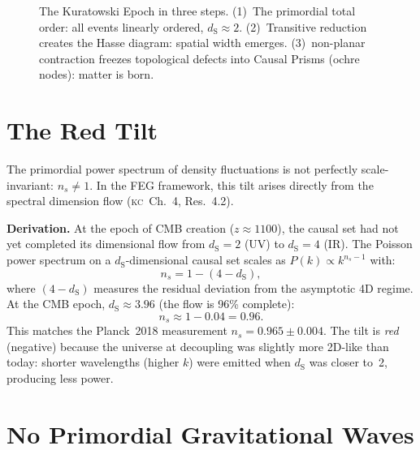 \documentclass[11pt, a4paper, openany]{book}
\newcommand{\dS}{d_{\mathrm{S}}}
\newcommand{\KC}[1]{\textnormal{(\textsc{kc}~#1)}}
\begin{document}
\begin{figure}[ht]
\caption{The Kuratowski Epoch in three steps.  (1)~The primordial
total order: all events linearly ordered, $\dS \approx 2$.
(2)~Transitive reduction creates the Hasse diagram: spatial width
emerges.  (3)~non-planar contraction freezes topological defects into
Causal Prisms (ochre nodes): matter is born.}
\label{fig:kuratowski-epoch}
\end{figure}

\section{The Red Tilt}\label{sec:tilt}

The primordial power spectrum of density fluctuations is not perfectly
scale-invariant: $n_s \neq 1$. In the FEG framework, this tilt arises
directly from the spectral dimension flow \KC{Ch.~4, Res.~4.2}.

\textbf{Derivation.} At the epoch of CMB creation ($z \approx 1100$),
the causal set had not yet completed its dimensional flow from
$\dS = 2$ (UV) to $\dS = 4$ (IR). The Poisson power spectrum on a
$\dS$-dimensional causal set scales as $P(k) \propto k^{n_s - 1}$
with:
\[
  n_s = 1 - (4 - \dS),
\]
where $(4 - \dS)$ measures the residual deviation from the asymptotic
4D regime. At the CMB epoch, $\dS \approx 3.96$ (the flow is 96\%
complete):
\[
  n_s \approx 1 - 0.04 = 0.96.
\]
This matches the Planck~2018 measurement $n_s = 0.965 \pm 0.004$.
The tilt is \emph{red} (negative) because the universe at decoupling
was slightly more 2D-like than today: shorter wavelengths (higher $k$)
were emitted when $\dS$ was closer to~2, producing less power.

\section{No Primordial Gravitational Waves}\label{sec:no-gw}
\end{document}
